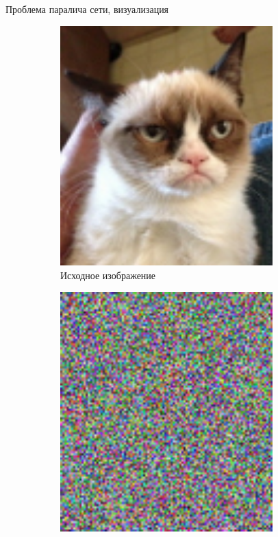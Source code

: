 \documentclass[10pt]{beamer}
\begin{document}
\begin{frame}{Проблема паралича сети, визуализация}

\begin{figure}
        \centering
        \begin{subfigure}[b]{0.5\textwidth}
                \includegraphics[width=0.9\textwidth]{images/cat.png}
                \caption{Исходное изображение}                
        \end{subfigure}%
        \begin{subfigure}[b]{0.5\textwidth}
                \includegraphics[width=0.9\textwidth]{images/cat_noised.png}

\end{subfigure}
\end{figure}
\end{frame}
\end{document}
